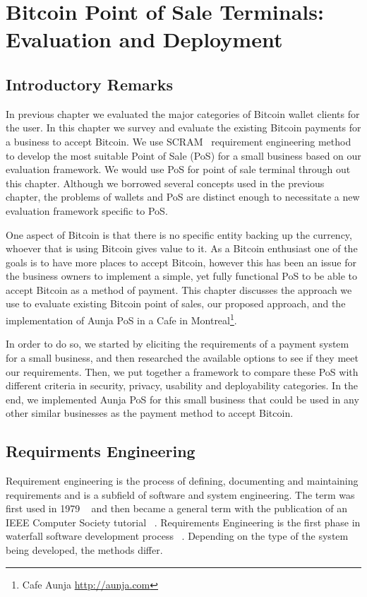 
\chapter{Bitcoin Point of Sale Terminals: Evaluation and Deployment}


\section{Introductory Remarks}

In previous chapter we evaluated the major categories of Bitcoin wallet clients for the user. In this chapter we survey and evaluate the existing Bitcoin payments for a business to accept Bitcoin. We use SCRAM~\cite{REScenario}  requirement engineering method to develop the most suitable Point of Sale (PoS) for a small business based on our evaluation framework. We would use PoS for point of sale terminal through out this chapter. Although we borrowed several concepts used in the previous chapter, the problems of wallets and PoS are distinct enough to necessitate a new evaluation framework specific to PoS.

One aspect of Bitcoin is that there is no specific entity backing up the currency, whoever that is using Bitcoin gives value to it. As a Bitcoin enthusiast one of the goals is to have more places to accept Bitcoin, however this has been an issue for the business owners to implement a simple, yet fully functional PoS to be able to accept Bitcoin as a method of payment.
This chapter discusses the approach we use to evaluate existing Bitcoin point of sales, our proposed approach, and the implementation of Aunja PoS in a Cafe in Montreal\footnote{ Cafe Aunja \url{http://aunja.com}}.

In order to do so, we started by eliciting the requirements of a payment system for a small business, and then researched the available options to see if they meet our requirements. Then, we put together a framework to compare these PoS with different criteria in security, privacy, usability and deployability categories. In the end, we implemented Aunja PoS for this small business that could be used in any other similar businesses as the payment method to accept Bitcoin.

\section {Requirments Engineering}
Requirement engineering is the process of defining, documenting and maintaining requirements and is a subfield of software and system engineering. The term was first used in 1979 ~\cite{alford1979software} and then became a general term with the publication of an IEEE Computer Society tutorial ~\cite{dorfman1990system}.
Requirements Engineering is the first phase in waterfall software development process ~\cite{rocye1970managing}. Depending on the type of the system being developed, the methods differ.

